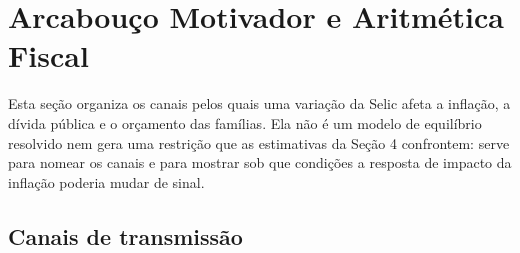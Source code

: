 \documentclass[12pt,a4paper]{article}
\begin{document}
\section{Arcabouço Motivador e Aritmética Fiscal}

Esta seção organiza os canais pelos quais uma variação da Selic afeta a inflação, a dívida pública e o orçamento das famílias. Ela não é um modelo de equilíbrio resolvido nem gera uma restrição que as estimativas da Seção 4 confrontem: serve para nomear os canais e para mostrar sob que condições a resposta de impacto da inflação poderia mudar de sinal.

\subsection{Canais de transmissão}
\end{document}
